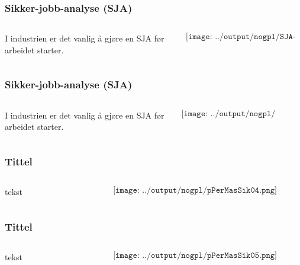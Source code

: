 \documentclass[aspectratio=169,xcolor=dvipsnames]{beamer}
\begin{document}
\begin{frame}
	\frametitle{Sikker-jobb-analyse (SJA)}
	\begin{columns}
		\begin{column}{0.5\textwidth}
I industrien er det vanlig å gjøre en SJA før arbeidet starter. 
			
		\end{column}


		\begin{column}{0.5\textwidth}
	$$\texttt{[image: ../output/nogpl/SJA-skjema.png]}$$
		\end{column}
	\end{columns}
\end{frame}
\begin{frame}
	\frametitle{Sikker-jobb-analyse (SJA)}
	\begin{columns}
		\begin{column}{0.5\textwidth}
I industrien er det vanlig å gjøre en SJA før arbeidet starter. 
			
		\end{column}


		\begin{column}{0.5\textwidth}
	$$\texttt{[image: ../output/nogpl/pPerMasSik03.png]}$$
		\end{column}
	\end{columns}
\end{frame}

\begin{frame}
	\frametitle{Tittel}
	\begin{columns}
		\begin{column}{0.5\textwidth}
tekst
			
		\end{column}

		\begin{column}{0.5\textwidth}
	$$\texttt{[image: ../output/nogpl/pPerMasSik04.png]}$$
		\end{column}
	\end{columns}
\end{frame}

\begin{frame}
	\frametitle{Tittel}
	\begin{columns}
		\begin{column}{0.5\textwidth}
tekst
			
		\end{column}

		\begin{column}{0.5\textwidth}
	$$\texttt{[image: ../output/nogpl/pPerMasSik05.png]}$$
		\end{column}
	\end{columns}
\end{frame}
\end{document}
